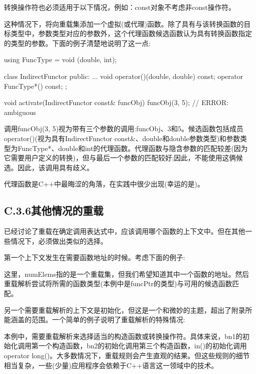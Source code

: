 \begin{notice}转换操作符也必须适用于以下情况，例如：const对象不考虑非const操作符。
\end{notice}

这种情况下，将向重载集添加一个虚拟(或代理)函数。除了具有与该转换函数的目标类型中，参数类型对应的参数外，这个代理函数候选函数认为具有转换函数指定的类型的参数。下面的例子清楚地说明了这一点:

\begin{cpp}
using FuncType = void (double, int);

class IndirectFunctor {
	public:
	...
	void operator()(double, double) const;
	operator FuncType*() const;
};

void activate(IndirectFunctor const& funcObj)
{
	funcObj(3, 5); // ERROR: ambiguous
}
\end{cpp}

调用funcObj(3, 5)视为带有三个参数的调用:funcObj、3和5。候选函数包括成员operator()(视为具有IndirectFunctor const\&、double和double参数类型)和参数类型为FuncType*、double和int的代理函数。代理函数与隐含参数的匹配较差(因为它需要用户定义的转换)，但与最后一个参数的匹配较好;因此，不能使用这俩候选。因此，该调用具有歧义。

代理函数是C++中最晦涩的角落，在实践中很少出现(幸运的是)。

\subsection{C.3.6\hspace{0.2cm}其他情况的重载}

已经讨论了重载在确定调用表达式中，应该调用哪个函数的上下文中。但在其他一些情况下，必须做出类似的选择。

第一个上下文发生在需要函数地址的时候。考虑下面的例子:


这里，numElems指的是一个重载集，但我们希望知道其中一个函数的地址。然后重载解析尝试将所需的函数类型(本例中是funcPtr的类型)与可用的候选函数匹配。

另一个需要重载解析的上下文是初始化，但这是一个和微妙的主题，超出了附录所能涵盖的范围。一个简单的例子说明了重载解析的特殊情况:


本例中，需要重载解析来选择适当的构造函数或转换操作符。具体来说，bn1的初始化调用第一个构造函数，bn2的初始化调用第三个构造函数，in()的初始化调用operator long()。大多数情况下，重载规则会产生直观的结果。但这些规则的细节相当复杂，一些(少量)应用程序会依赖于C++语言这一领域中的技术。













